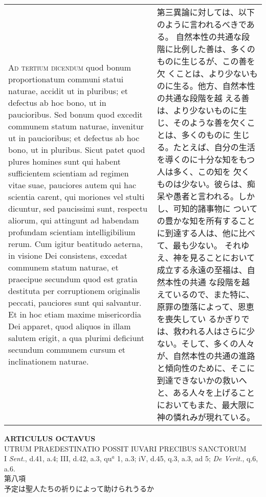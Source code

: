 \documentclass[10pt]{jsarticle} %
\begin{document}
\begin{longtable}{p{21em}p{21em}}
\\


{\scshape Ad tertium dicendum} quod bonum proportionatum
communi statui naturae, accidit ut in pluribus; et defectus ab hoc bono,
ut in paucioribus. Sed bonum quod excedit communem statum naturae,
invenitur ut in paucioribus; et defectus ab hoc bono, ut in
pluribus. Sicut patet quod plures homines sunt qui habent sufficientem
scientiam ad regimen vitae suae, pauciores autem qui hac scientia
carent, qui moriones vel stulti dicuntur, sed paucissimi sunt, respectu
aliorum, qui attingunt ad habendam profundam scientiam intelligibilium
rerum. Cum igitur beatitudo aeterna, in visione Dei consistens, excedat
communem statum naturae, et praecipue secundum quod est gratia destituta
per corruptionem originalis peccati, pauciores sunt qui salvantur. Et in
hoc etiam maxime misericordia Dei apparet, quod aliquos in illam salutem
erigit, a qua plurimi deficiunt secundum communem cursum et
inclinationem naturae.


&

第三異論に対しては、以下のように言われるべきである。
自然本性の共通な段階に比例した善は、多くのものに生じるが、この善を欠
 くことは、より少ないものに生る。他方、自然本性の共通な段階を越
 える善は、より少ないものに生じ、そのような善を欠くことは、多くのものに
 生じる。たとえば、自分の生活を導くのに十分な知をもつ人は多く、この知を
 欠くものは少ない。彼らは、痴呆や愚者と言われる。しかし、可知的諸事物に
 ついての豊かな知を所有することに到達する人は、他に比べて、最も少ない。
それゆえ、神を見ることにおいて成立する永遠の至福は、自然本性の共通
 な段階を越えているので、また特に、原罪の堕落によって、恩恵を喪失してい
 るかぎりでは、救われる人はさらに少ない。そして、多くの人々が、自然本性の共通の進路
 と傾向性のために、そこに到達できないかの救いへと、ある人々を上げること
 においてもまた、最大限に
 神の憐れみが現れている。


\end{longtable}
\newpage





\begin{center}
 {\Large {\bf ARTICULUS OCTAVUS}}\\
 {\large UTRUM PRAEDESTINATIO POSSIT IUVARI PRECIBUS SANCTORUM}\\
 {\footnotesize I {\itshape Sent.}, d.41, a.4; III, d.42, a.3, qu$^a$ 1,
 a.3; iV, d.45, q.3, a.3, ad 5; {\itshape De Verit.}, q.6, a.6.}\\
 {\Large 第八項\\予定は聖人たちの祈りによって助けられうるか}
\end{center}
\end{document}
